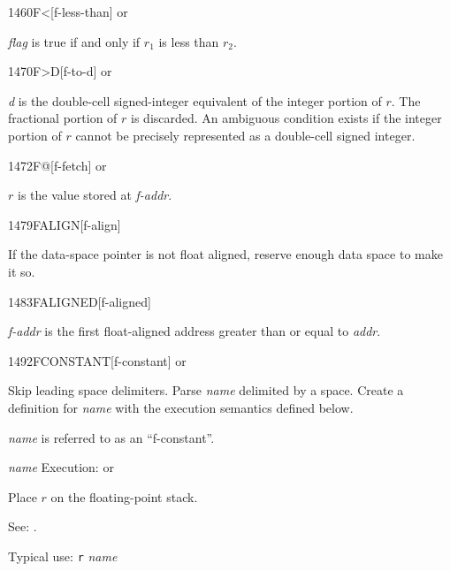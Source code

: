 \begin{newword}[Fless]{1460}{F<}[f-less-than]
	  or

	\emph{flag} is true if and only if $r_1$ is less than $r_2$.
\end{newword}


\begin{newword}[FtoD]{1470}{F>D}[f-to-d]
	  or

	\emph{d} is the double-cell signed-integer equivalent of the
	integer portion of $r$. The fractional portion of $r$ is
	discarded. An ambiguous condition exists if the integer portion
	of $r$ cannot be precisely represented as a double-cell signed
	integer.
\end{newword}


\begin{newword}{1472}{F@}[f-fetch]
	  or

	$r$ is the value stored at \emph{f-addr}.
\end{newword}


\begin{newword}{1479}{FALIGN}[f-align]
	\stack{}{}

	If the data-space pointer is not float aligned, reserve enough
	data space to make it so.
\end{newword}


\begin{newword}{1483}{FALIGNED}[f-aligned]

	\emph{f-addr} is the first float-aligned address greater than
	or equal to \emph{addr}.
\end{newword}


\begin{newword}{1492}{FCONSTANT}[f-constant]
	  or

	Skip leading space delimiters. Parse \emph{name} delimited by a
	space. Create a definition for \emph{name} with the execution
	semantics defined below.

	\emph{name} is referred to as an ``f-constant''.

\item[\emph{name} Execution:]
	\stack{}{}  or

	Place $r$ on the floating-point stack.

\item[See:]
	.

	\begin{rationale} %
		Typical use: \texttt{r}  \emph{name}
	\end{rationale}
\end{newword}


